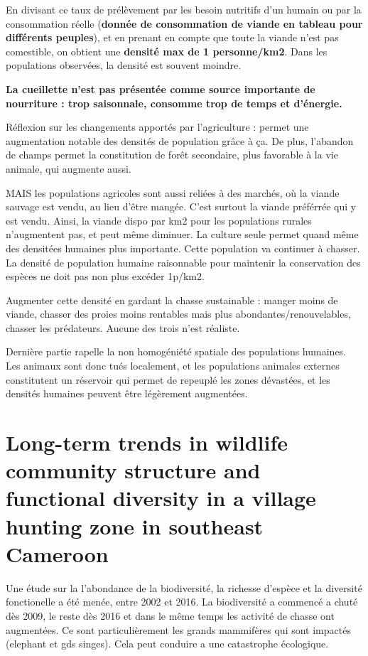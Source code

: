 \documentclass{article}
\begin{document}
En divisant ce taux de prélèvement par les besoin nutritifs d'un humain ou par la consommation réelle (\textbf{donnée de consommation de viande en tableau pour différents peuples}), et en prenant en compte que toute la viande n'est pas comestible, on obtient une \textbf{densité max de 1 personne/km2}. Dans les populations observées, la densité est souvent moindre.

\textbf{La cueillette n'est pas présentée comme source importante de nourriture : trop saisonnale, consomme trop de temps et d'énergie.} 

Réflexion sur les changements apportés par l'agriculture : permet une augmentation notable des densités de population grâce à ça. De plus, l'abandon de champs permet la constitution de forêt secondaire, plus favorable à la vie animale, qui augmente aussi.

MAIS les populations agricoles sont aussi reliées à des marchés,  où la viande sauvage est vendu, au lieu d'être mangée. C'est surtout la viande préférrée qui y est vendu. Ainsi, la viande dispo par km2 pour les populations rurales n'augmentent pas, et peut même diminuer.
La culture seule permet quand même des densitées humaines plus importante. Cette population va continuer à chasser. La densité de population humaine raisonnable pour maintenir la conservation des espèces ne doit pas non plus excéder 1p/km2.

Augmenter cette densité en gardant la chasse sustainable : manger moins de viande, chasser des proies moins rentables mais plus abondantes/renouvelables, chasser les prédateurs. Aucune des trois n'est réaliste.

Dernière partie rapelle la non homogéniété spatiale des populations humaines. Les animaux sont donc tués localement, et les populations animales externes constitutent un réservoir qui permet de repeuplé les zones dévastées, et les densités humaines peuvent être légèrement augmentées.


\section{Long-term trends in wildlife community structure and functional diversity in a village hunting zone in southeast Cameroon}

Une étude sur la l'abondance de la biodiversité, la richesse d'espèce et la diversité fonctionelle a été menée, entre 2002 et 2016. La biodiversité a commencé a chuté dès 2009, le reste dès 2016 et dans le même temps les activité de chasse ont augmentées. Ce sont particulièrement les grands mammifères qui sont impactés (elephant et gds singes). Cela peut conduire a une catastrophe écologique.
\end{document}
